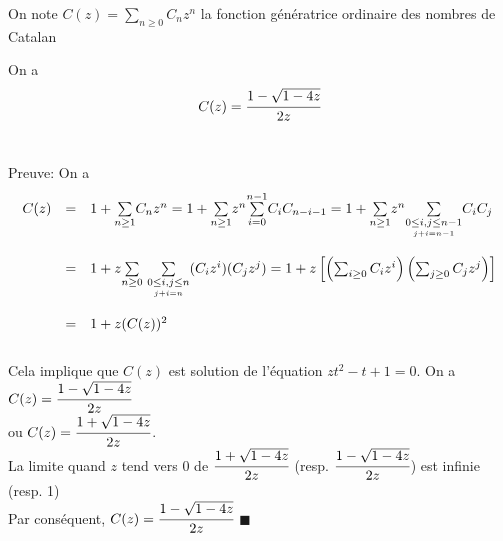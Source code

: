 On note $C(z)=\underset{n\geq 0}{\sum}C_{n}z^{n}$ la fonction génératrice ordinaire des nombres de Catalan
\begin{proposition}
	\begin{rm}
		On a \[C(z)=\cfrac{1-
				\sqrt{1-4z}}{2z}\]\\
	\end{rm}
\end{proposition}
Preuve: On a\\\[
	\begin{array}{r r l}
		C(z) & =       & 1+\underset{n\geq1}{\sum}C_{n}z^n = 1+ \underset{n\geq1}{\sum}z^{n}\underset{i=0}{\overset{n-1}{\sum}}C_{i}C_{n-i-1} = 1+
		\underset{n\geq1}{\sum}z^n\underset{\underset{j+i=n-1}{0\leq i, j \leq n-1}}{\sum}C_{i}C_{j}                                               \\
		     & \text{} &                                                                                                                           \\
		     & =       & 1+z\underset{n\geq0}{\sum}\text{ }\underset{\underset{j+i=n}{0\leq i, j \leq n}}{\sum}(C_{i}z^i)(C_{j}z^j)
		= 1 +z\left[\left(\sum_{i\geq0}C_{i}z^i\right)\left(\sum_{j\geq0}C_{j}z^j\right)\right]                                                    \\
		     & \text{} &                                                                                                                           \\
		     & =       & 1+z(C(z))^2
	\end{array}
\]\\
Cela implique que $C(z)$ est solution de l'équation $zt^2-t+1 = 0$. On a $C(z)=\cfrac{1-\sqrt{1-4z}}{2z}$\\ ou $C(z)=\cfrac{1+\sqrt{1-4z}}{2z}$.\\
La limite quand $z$ tend vers $0$ de $\cfrac{1+\sqrt{1-4z}}{2z}$ (resp. $\cfrac{1-\sqrt{1-4z}}{2z}$) est infinie (resp. 1) \\
Par conséquent, $C(z)=\cfrac{1-\sqrt{1-4z}}{2z}$ \hspace{5pt}$\blacksquare$

